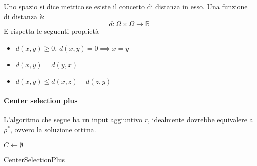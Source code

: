 \begin{definition}

    Uno spazio si dice metrico se esiste il concetto di distanza in esso.
    Una funzione di distanza è: 
    $$d : \Omega \times \Omega \longrightarrow \mathbb{R} $$
    E rispetta le seguenti proprietà
    \begin{itemize}
        \item $d(x,y) \geq 0 $, $d(x,y) = 0 \implies x = y$
        \item $d(x,y) = d(y,x)$
        \item $d(x,y) \leq d(x,z) + d(z,y)$
    \end{itemize}
\end{definition}

\paragraph{Center selection plus}
L'algoritmo che segue ha un input aggiuntivo $r$, idealmente dovrebbe equivalere a 
$\rho^*$, ovvero la soluzione ottima.

\begin{algorithm}[H]
    \SetAlgoLined
    $C \gets \emptyset$\\
     \caption{CenterSelectionPlus}
\end{algorithm}


